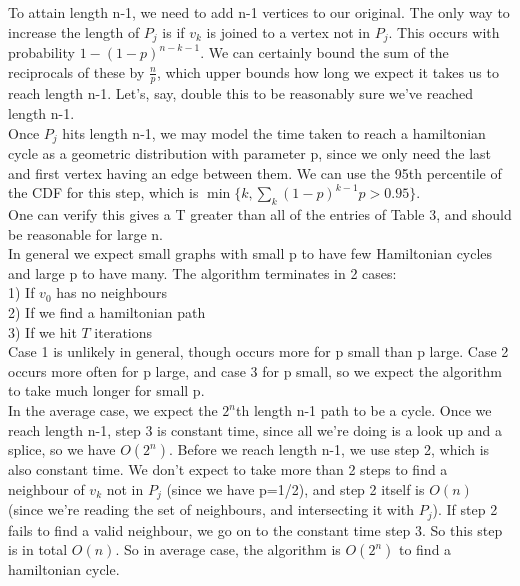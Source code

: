 \documentclass[10pt,a4paper]{report}
\begin{document}
To attain length n-1, we need to add n-1 vertices to our original. The only way to increase the length of $P_j$ is if $v_k$ is joined to a vertex not in $P_j$. This occurs with probability $1-(1-p)^{n-k-1}$. We can certainly bound the sum of the reciprocals of these by $\frac{n}{p}$, which upper bounds how long we expect it takes us to reach length n-1. Let's, say, double this to be reasonably sure we've reached length n-1.\\

Once $P_j$ hits length n-1, we may model the time taken to reach a hamiltonian cycle as a geometric distribution with parameter p, since we only need the last and first vertex having an edge between them. We can use the 95th percentile of the CDF for this step, which  is $\min\{k, \sum_k (1-p)^{k-1}p > 0.95\}$.\\

One can verify this gives a T greater than all of the entries of Table 3, and should be reasonable for large n.\\


In general we expect small graphs with small p to have few Hamiltonian cycles and large p to have many. The algorithm terminates in 2 cases:\\

1) If $v_0$ has no neighbours\\
2) If we find a hamiltonian path \\
3) If we hit $T$ iterations\\

Case 1 is unlikely in general, though occurs more for p small than p large. Case 2 occurs more often for p large, and case 3 for p small, so we expect the algorithm to take much longer for small p. \\

In the average case, we expect the $2^n$th length n-1 path to be a cycle. Once we reach length n-1, step 3 is constant time, since all we're doing is a look up and a splice, so we have $O(2^n)$. Before we reach length n-1, we use step 2, which is also constant time. We don't expect to take more than 2 steps to find a neighbour of $v_k$ not in $P_j$ (since we have p=1/2), and step 2 itself is $O(n)$ (since we're reading the set of neighbours, and intersecting it with $P_j$). If step 2 fails to find a valid neighbour, we go on to the constant time step 3. So this step is in total $O(n)$. So in average case, the algorithm is $O(2^n)$ to find a hamiltonian cycle.\\
\end{document}
